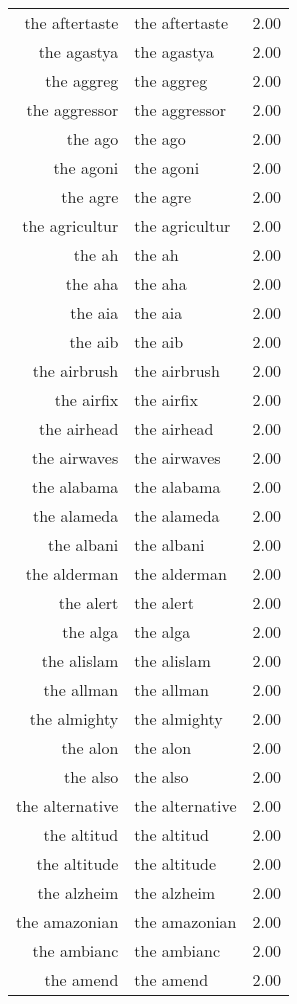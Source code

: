 \begin{table}[ht]
\begin{tabular}{rlr}
  the aftertaste & the aftertaste & 2.00 \\ 
  the agastya & the agastya & 2.00 \\ 
  the aggreg & the aggreg & 2.00 \\ 
  the aggressor & the aggressor & 2.00 \\ 
  the ago & the ago & 2.00 \\ 
  the agoni & the agoni & 2.00 \\ 
  the agre & the agre & 2.00 \\ 
  the agricultur & the agricultur & 2.00 \\ 
  the ah & the ah & 2.00 \\ 
  the aha & the aha & 2.00 \\ 
  the aia & the aia & 2.00 \\ 
  the aib & the aib & 2.00 \\ 
  the airbrush & the airbrush & 2.00 \\ 
  the airfix & the airfix & 2.00 \\ 
  the airhead & the airhead & 2.00 \\ 
  the airwaves & the airwaves & 2.00 \\ 
  the alabama & the alabama & 2.00 \\ 
  the alameda & the alameda & 2.00 \\ 
  the albani & the albani & 2.00 \\ 
  the alderman & the alderman & 2.00 \\ 
  the alert & the alert & 2.00 \\ 
  the alga & the alga & 2.00 \\ 
  the alislam & the alislam & 2.00 \\ 
  the allman & the allman & 2.00 \\ 
  the almighty & the almighty & 2.00 \\ 
  the alon & the alon & 2.00 \\ 
  the also & the also & 2.00 \\ 
  the alternative & the alternative & 2.00 \\ 
  the altitud & the altitud & 2.00 \\ 
  the altitude & the altitude & 2.00 \\ 
  the alzheim & the alzheim & 2.00 \\ 
  the amazonian & the amazonian & 2.00 \\ 
  the ambianc & the ambianc & 2.00 \\ 
  the amend & the amend & 2.00 \\ 

\end{tabular}
\end{table}
